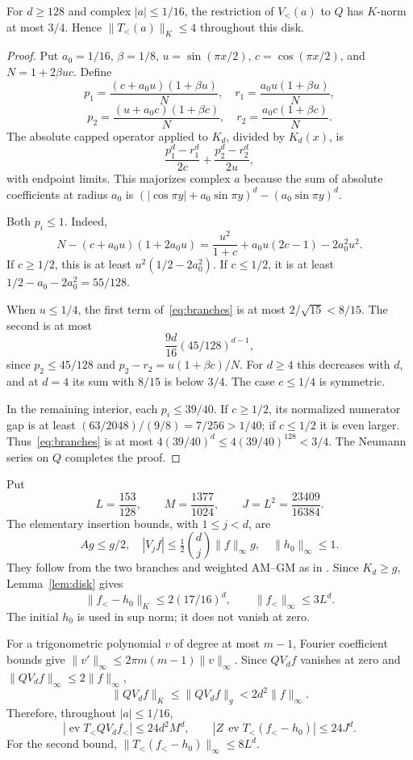 \documentclass[11pt,a4paper]{article}
\theoremstyle{remark}\newtheorem*{ednote}{Editorial note (ProveIt, 2026-10-01)}
\newcommand{\ev}{\operatorname{ev}}\newcommand{\Z}{\mathbb Z}
\begin{document}
\begin{lemma}\label{lem:disk}
For $d\ge128$ and complex $|a|\le1/16$, the restriction of $V_{<}(a)$ to $Q$ has $K$-norm at most $3/4$. Hence $\|T_{<}(a)\|_K\le4$ throughout this disk.
\end{lemma}
\begin{proof}
Put $a_0=1/16$, $\beta=1/8$, $u=\sin(\pi x/2)$, $c=\cos(\pi x/2)$, and $N=1+2\beta uc$. Define
\[
p_1=\frac{(c+a_0u)(1+\beta u)}N,\quad r_1=\frac{a_0u(1+\beta u)}N,
\]
\[
p_2=\frac{(u+a_0c)(1+\beta c)}N,\quad r_2=\frac{a_0c(1+\beta c)}N.
\]
The absolute capped operator applied to $K_d$, divided by $K_d(x)$, is
\begin{equation}\label{eq:branches}
\frac{p_1^d-r_1^d}{2c}+\frac{p_2^d-r_2^d}{2u},
\end{equation}
with endpoint limits. This majorizes complex $a$ because the sum of absolute coefficients at radius $a_0$ is $(|\cos\pi y|+a_0\sin\pi y)^d-(a_0\sin\pi y)^d$.

Both $p_i\le1$. Indeed,
\[
N-(c+a_0u)(1+2a_0u)=\frac{u^2}{1+c}+a_0u(2c-1)-2a_0^2u^2.
\]
If $c\ge1/2$, this is at least $u^2(1/2-2a_0^2)$. If $c\le1/2$, it is at least $1/2-a_0-2a_0^2=55/128$.

When $u\le1/4$, the first term of~\eqref{eq:branches} is at most $2/\sqrt{15}<8/15$. The second is at most
\[
\frac{9d}{16}(45/128)^{d-1},
\]
since $p_2\le45/128$ and $p_2-r_2=u(1+\beta c)/N$. For $d\ge4$ this decreases with $d$, and at $d=4$ its sum with $8/15$ is below $3/4$. The case $c\le1/4$ is symmetric.

In the remaining interior, each $p_i\le39/40$. If $c\ge1/2$, its normalized numerator gap is at least $(63/2048)/(9/8)=7/256>1/40$; if $c\le1/2$ it is even larger. Thus~\eqref{eq:branches} is at most $4(39/40)^d\le4(39/40)^{128}<3/4$. The Neumann series on $Q$ completes the proof.
\end{proof}

Put
\[
L=\frac{153}{128},\qquad M=\frac{1377}{1024},\qquad J=L^2=\frac{23409}{16384}.
\]
The elementary insertion bounds, with $1\le j<d$, are
\[
Ag\le g/2,\quad |V_jf|\le\tfrac12\binom dj\|f\|_\infty g,\quad\|h_0\|_\infty\le1.
\]
They follow from the two branches and weighted AM--GM as in \cite{boundary,offset}. Since $K_d\ge g$, Lemma~\ref{lem:disk} gives
\[
\|f_{<}-h_0\|_K\le2(17/16)^d,\qquad\|f_{<}\|_\infty\le3L^d.
\]
The initial $h_0$ is used in sup norm; it does not vanish at zero.

For a trigonometric polynomial $v$ of degree at most $m-1$, Fourier coefficient bounds give $\|v'\|_\infty\le2\pi m(m-1)\|v\|_\infty$. Since $QV_df$ vanishes at zero and $\|QV_df\|_\infty\le2\|f\|_\infty$,
\[
\|QV_df\|_K\le\|QV_df\|_g<2d^2\|f\|_\infty.
\]
Therefore, throughout $|a|\le1/16$,
\begin{equation}\label{eq:analyticbounds}
|\ev T_{<}QV_df_{<}|\le24d^2M^d,\qquad
|Z\,\ev T_{<}(f_{<}-h_0)|\le24J^d.
\end{equation}
For the second bound, $\|T_{<}(f_{<}-h_0)\|_\infty\le8L^d$.
\end{document}
